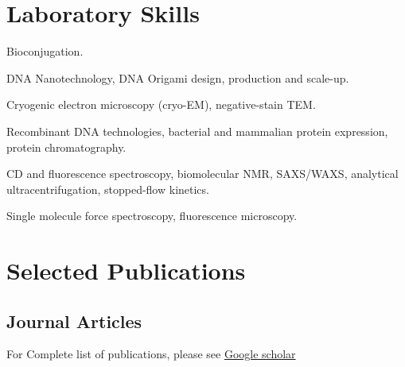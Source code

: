 \documentclass[12pt,letterpaper]{report}
\newcommand{\listitemspace}{0.25em}
\renewenvironment{itemize}
{\begin{list}{}{\setlength{\leftmargin}{0em}
                \setlength{\parskip}{0em}
                \setlength{\itemsep}{\listitemspace}
                \setlength{\parsep}{\listitemspace}}}
{\end{list}}
\begin{document}
    \section*{Laboratory Skills}
    \begin{itemize}
        \item \textbullet \hspace{0.2cm} Bioconjugation.
        \item \textbullet \hspace{0.2cm} DNA Nanotechnology, DNA Origami design, production and scale-up.
        \item \textbullet \hspace{0.2cm} Cryogenic electron microscopy (cryo-EM), negative-stain TEM.
        \item \textbullet \hspace{0.2cm} Recombinant DNA technologies, bacterial and mammalian protein expression, protein chromatography.
        \item \textbullet \hspace{0.2cm} CD and fluorescence spectroscopy, biomolecular NMR, SAXS/WAXS, analytical ultracentrifugation, stopped-flow kinetics.
        \item \textbullet \hspace{0.2cm} Single molecule force spectroscopy, fluorescence microscopy.
    \end{itemize}

    \section*{Selected Publications}

    \subsection*{Journal Articles}
    For Complete list of publications, please see \href{https://scholar.google.com/citations?user=K91MviEAAAAJ&hl=en}{Google scholar}\\
\end{document}

